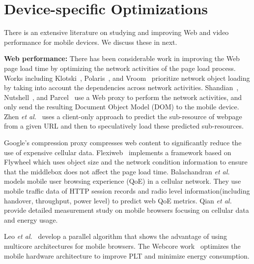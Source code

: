 \section{Device-specific Optimizations}

There is an extensive literature on studying and improving Web and video performance for mobile devices. We discuss these in next. 

\noindent\textbf{Web performance:}
There has been considerable work in improving the Web page load time by optimizing the network activities of the page load process. Works including Klotski~\cite{butkiewicz2015klotski}, Polaris~\cite{netravali2016polaris}, and Vroom~\cite{ruamviboonsuk2017vroom} prioritize network object loading by taking into account the dependencies across network activities. 
Shandian~\cite{wang2016speeding}, Nutshell~\cite{sivakumar2017nutshell}, and Parcel~\cite{sivakumar2014parcel} use a Web proxy to perform the network activities, and only send the resulting Document Object Model (DOM) to the mobile device. Zhen \emph{et al.}~\cite{wang2012far} uses a client-only approach to predict the sub-resource of  webpage from a given URL and then to speculatively load these predicted sub-resources. 

Google's compression proxy \cite{agababov2015flywheel} compresses web content to significantly reduce the use of expensive cellular data.
Flexiweb~\cite{singh2015flexiweb} implements a framework based on Flywheel which uses object size and the network condition information to ensure that the middlebox does not affect the page load time. 
Balachandran \emph{et al.}~\cite{balachandran2014modeling} models mobile user browsing experience (QoE) in a cellular network. 
They use mobile traffic data of HTTP session records and radio level information(including handover, throughput, power level)  to predict web QoE metrics. %
Qian \emph{et al.}~\cite{qian2014characterizing} provide detailed measurement study on mobile browsers focusing on cellular data and energy usage. 

Leo \emph{et al.}~\cite{meyerovich2010fast} develop a parallel algorithm that shows the advantage of using multicore architectures for mobile browsers. The Webcore work~\cite{zhu2017optimizing} optimizes the mobile
hardware architecture to improve PLT and minimize energy consumption.

